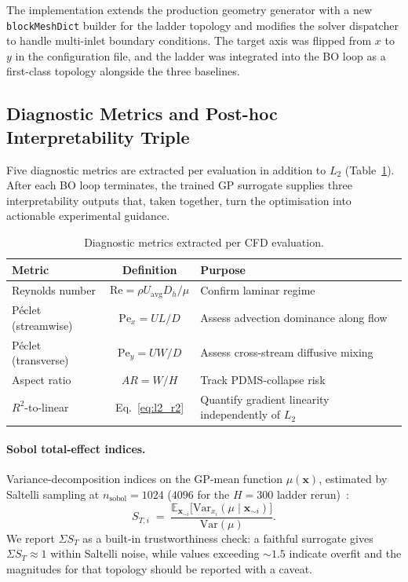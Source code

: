 \documentclass[12pt]{article}
\begin{document}
The implementation extends the production geometry generator with a new \texttt{blockMeshDict} builder for the ladder topology and modifies the solver dispatcher to handle multi-inlet boundary conditions. The target axis was flipped from $x$ to $y$ in the configuration file, and the ladder was integrated into the BO loop as a first-class topology alongside the three baselines.

\subsection{Diagnostic Metrics and Post-hoc Interpretability Triple}
\label{sec:interpretability_methods}
Five diagnostic metrics are extracted per evaluation in addition to $L_2$ (Table~\ref{tab:diagnostic_metrics}). After each BO loop terminates, the trained GP surrogate supplies three interpretability outputs that, taken together, turn the optimisation into actionable experimental guidance.

\begin{table}[H]
\centering
\caption{Diagnostic metrics extracted per CFD evaluation.}
\label{tab:diagnostic_metrics}
\begin{tabular}{l c p{5cm}}
\toprule
\textbf{Metric} & \textbf{Definition} & \textbf{Purpose} \\
\midrule
Reynolds number & $\text{Re} = \rho U_{\text{avg}} D_h / \mu$ & Confirm laminar regime \\
P\'eclet (streamwise) & $\text{Pe}_x = U L / D$ & Assess advection dominance along flow \\
P\'eclet (transverse) & $\text{Pe}_y = U W / D$ & Assess cross-stream diffusive mixing \\
Aspect ratio & $AR = W/H$ & Track PDMS-collapse risk \\
$R^2$-to-linear & Eq.~\ref{eq:l2_r2} & Quantify gradient linearity independently of $L_2$ \\
\bottomrule
\end{tabular}
\end{table}

\paragraph{Sobol total-effect indices.} Variance-decomposition indices on the GP-mean function $\mu(\mathbf{x})$, estimated by Saltelli sampling at $n_{\text{sobol}} = 1024$ ($4096$ for the $H = 300$ ladder rerun)~\cite{sobol2001,saltelli2010}:
\begin{equation}
S_{T,i} \;=\; \frac{\mathbb{E}_{\mathbf{x}_{\sim i}}\!\big[ \mathrm{Var}_{x_i}(\mu \mid \mathbf{x}_{\sim i}) \big]}{\mathrm{Var}(\mu)}.
\label{eq:sobol_st}
\end{equation}
We report $\Sigma S_T$ as a built-in trustworthiness check: a faithful surrogate gives $\Sigma S_T \approx 1$ within Saltelli noise, while values exceeding $\sim 1.5$ indicate overfit and the magnitudes for that topology should be reported with a caveat.
\end{document}
